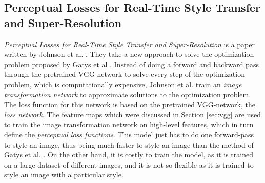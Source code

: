 \subsection{Perceptual Losses for Real-Time Style Transfer and Super-Resolution}
\label{seq:johnson}
\textit{Perceptual Losses for Real-Time Style Transfer and Super-Resolution} is a paper written by Johnson et al. \cite{Johnson:1}. They take a new approach to solve the optimization problem proposed by Gatys et al \cite{Gatys:1}. Instead of doing a forward and backward pass through the pretrained VGG-network to solve every step of the optimization problem, which is computationally expensive, Johnson et al. train an \textit{image transformation network} to approximate solutions to the optimization problem. The loss function for this network is based on the pretrained VGG-network, the \textit{loss network}. The feature maps which were discussed in Section \ref{sec:vgg} are used to train the image transformation network on high-level features, which in turn define the \textit{perceptual loss functions}. This model just has to do one forward-pass to style an image, thus being much faster to style an image than the method of Gatys et al. \cite{Gatys:1}. On the other hand, it is costly to train the model, as it is trained on a large dataset of different images, and it is not so flexible as it is trained to style an image with a particular style.
